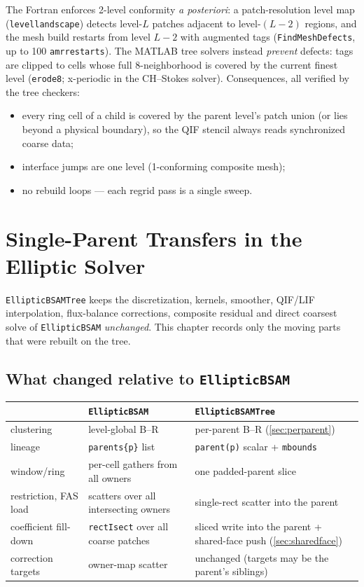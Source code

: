 \documentclass[11pt,oneside,openany]{book}
\newcommand{\code}[1]{\textnormal{\texttt{#1}}}
\begin{document}
The Fortran enforces 2-level conformity \emph{a posteriori}: a
patch-resolution level map (\code{levellandscape}) detects level-$L$
patches adjacent to level-$(L{-}2)$ regions, and the mesh build restarts
from level $L{-}2$ with augmented tags (\code{FindMeshDefects}, up to
100 \code{amrrestarts}).  The MATLAB tree solvers instead \emph{prevent}
defects: tags are clipped to cells whose full 8-neighborhood is covered
by the current finest level (\code{erode8}; x-periodic in the
CH--Stokes solver).  Consequences, all verified by the tree checkers:

\begin{itemize}[leftmargin=2em]
\item every ring cell of a child is covered by the parent level's
patch union (or lies beyond a physical boundary), so the QIF stencil
always reads synchronized coarse data;
\item interface jumps are one level (1-conforming composite mesh);
\item no rebuild loops --- each regrid pass is a single sweep.
\end{itemize}

\chapter{Single-Parent Transfers in the Elliptic Solver}
\label{ch:ebt}

\code{EllipticBSAMTree} keeps the discretization, kernels, smoother,
QIF/LIF interpolation, flux-balance corrections, composite residual and
direct coarsest solve of \code{EllipticBSAM} \emph{unchanged}.  This
chapter records only the moving parts that were rebuilt on the tree.

\section{What changed relative to \code{EllipticBSAM}}

\begin{center}\small
\begin{tabular}{@{}p{}p{}p{}@{}}
\toprule
 & \code{EllipticBSAM} & \code{EllipticBSAMTree} \\
\midrule
clustering & level-global B--R & per-parent B--R (\cref{sec:perparent}) \\
lineage & \code{parents\{p\}} list & \code{parent(p)} scalar + \code{mbounds} \\
window/ring & per-cell gathers from all owners & one padded-parent slice \\
restriction, FAS load & scatters over all intersecting owners & single-rect scatter into the parent \\
coefficient fill-down & \code{rectIsect} over all coarse patches & sliced write into the parent + shared-face push (\cref{sec:sharedface}) \\
correction targets & owner-map scatter & unchanged (targets may be the parent's siblings) \\
\bottomrule
\end{tabular}
\end{center}
\end{document}
